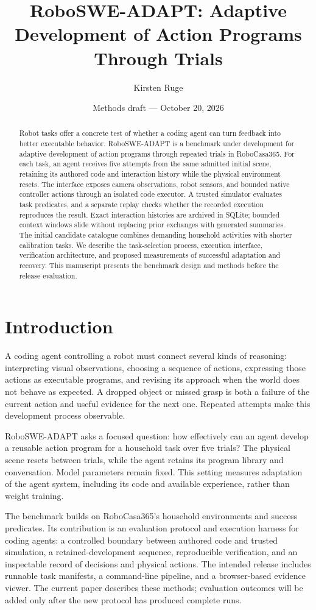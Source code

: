 \documentclass[11pt]{article}
\title{RoboSWE-ADAPT: Adaptive Development of Action Programs Through Trials}
\author{Kirsten Ruge}
\date{Methods draft --- October 20, 2026}
\begin{document}
\maketitle
\begin{abstract}
Robot tasks offer a concrete test of whether a coding agent can turn feedback into better executable behavior. RoboSWE-ADAPT is a benchmark under development for adaptive development of action programs through repeated trials in RoboCasa365. For each task, an agent receives five attempts from the same admitted initial scene, retaining its authored code and interaction history while the physical environment resets. The interface exposes camera observations, robot sensors, and bounded native controller actions through an isolated code executor. A trusted simulator evaluates task predicates, and a separate replay checks whether the recorded execution reproduces the result. Exact interaction histories are archived in SQLite; bounded context windows slide without replacing prior exchanges with generated summaries. The initial candidate catalogue combines demanding household activities with shorter calibration tasks. We describe the task-selection process, execution interface, verification architecture, and proposed measurements of successful adaptation and recovery. This manuscript presents the benchmark design and methods before the release evaluation.
\end{abstract}

\section{Introduction}
A coding agent controlling a robot must connect several kinds of reasoning: interpreting visual observations, choosing a sequence of actions, expressing those actions as executable programs, and revising its approach when the world does not behave as expected. A dropped object or missed grasp is both a failure of the current action and useful evidence for the next one. Repeated attempts make this development process observable.

RoboSWE-ADAPT asks a focused question: how effectively can an agent develop a reusable action program for a household task over five trials? The physical scene resets between trials, while the agent retains its program library and conversation. Model parameters remain fixed. This setting measures adaptation of the agent system, including its code and available experience, rather than weight training.

The benchmark builds on RoboCasa365's household environments and success predicates. Its contribution is an evaluation protocol and execution harness for coding agents: a controlled boundary between authored code and trusted simulation, a retained-development sequence, reproducible verification, and an inspectable record of decisions and physical actions. The intended release includes runnable task manifests, a command-line pipeline, and a browser-based evidence viewer. The current paper describes these methods; evaluation outcomes will be added only after the new protocol has produced complete runs.
\end{document}
